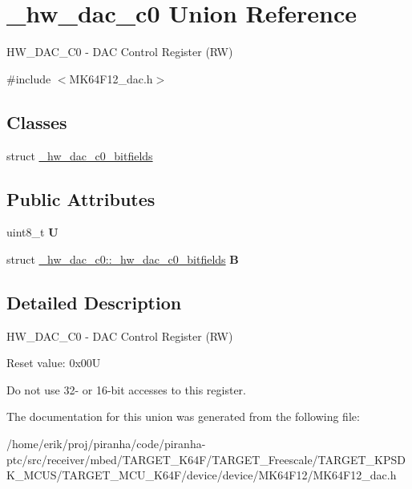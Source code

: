 \hypertarget{union__hw__dac__c0}{}\section{\+\_\+hw\+\_\+dac\+\_\+c0 Union Reference}
\label{union__hw__dac__c0}


H\+W\+\_\+\+D\+A\+C\+\_\+\+C0 -\/ D\+AC Control Register (RW)  




{\ttfamily \#include $<$M\+K64\+F12\+\_\+dac.\+h$>$}

\subsection*{Classes}
\begin{DoxyCompactItemize}
\item 
struct \hyperlink{struct__hw__dac__c0_1_1__hw__dac__c0__bitfields}{\+\_\+hw\+\_\+dac\+\_\+c0\+\_\+bitfields}
\end{DoxyCompactItemize}
\subsection*{Public Attributes}
\begin{DoxyCompactItemize}
\item 
uint8\+\_\+t {\bfseries U}\hypertarget{union__hw__dac__c0_a203ed7bdefec255bf68f57265a156c2b}{}\label{union__hw__dac__c0_a203ed7bdefec255bf68f57265a156c2b}

\item 
struct \hyperlink{struct__hw__dac__c0_1_1__hw__dac__c0__bitfields}{\+\_\+hw\+\_\+dac\+\_\+c0\+::\+\_\+hw\+\_\+dac\+\_\+c0\+\_\+bitfields} {\bfseries B}\hypertarget{union__hw__dac__c0_a94fe7bd8bab324bb6914b453187674d9}{}\label{union__hw__dac__c0_a94fe7bd8bab324bb6914b453187674d9}

\end{DoxyCompactItemize}


\subsection{Detailed Description}
H\+W\+\_\+\+D\+A\+C\+\_\+\+C0 -\/ D\+AC Control Register (RW) 

Reset value\+: 0x00U

Do not use 32-\/ or 16-\/bit accesses to this register. 

The documentation for this union was generated from the following file\+:\begin{DoxyCompactItemize}
\item 
/home/erik/proj/piranha/code/piranha-\/ptc/src/receiver/mbed/\+T\+A\+R\+G\+E\+T\+\_\+\+K64\+F/\+T\+A\+R\+G\+E\+T\+\_\+\+Freescale/\+T\+A\+R\+G\+E\+T\+\_\+\+K\+P\+S\+D\+K\+\_\+\+M\+C\+U\+S/\+T\+A\+R\+G\+E\+T\+\_\+\+M\+C\+U\+\_\+\+K64\+F/device/device/\+M\+K64\+F12/M\+K64\+F12\+\_\+dac.\+h\end{DoxyCompactItemize}
